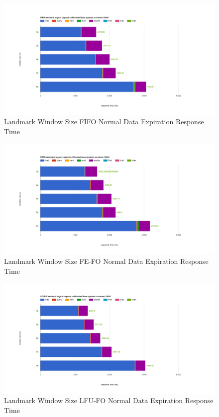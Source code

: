 \begin{figure}[!htbp]
	\centering
    \includegraphics[width=\textwidth]{img/app3-land-ws-fifo-normal-r.png}
    \caption{Landmark Window Size FIFO Normal Data Expiration Response Time}
\end{figure}
\begin{figure}[!htbp]
	\centering
    \includegraphics[width=\textwidth]{img/app3-land-ws-fefo-normal-r.png}
    \caption{Landmark Window Size FE-FO Normal Data Expiration Response Time}
\end{figure}
\begin{figure}[!htbp]
	\centering
    \includegraphics[width=\textwidth]{img/app3-land-ws-lfufo-normal-r.png}
    \caption{Landmark Window Size LFU-FO Normal Data Expiration Response Time}
\end{figure}
